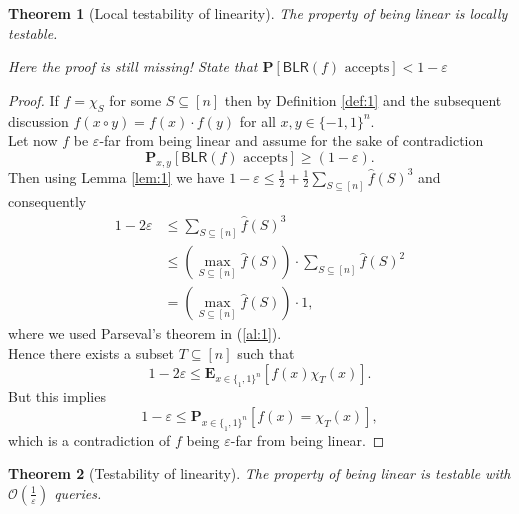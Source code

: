 \documentclass[a4paper]{article}
\newcommand{\prob}{\mathbf{P}}
\newcommand{\expe}{\mathbf{E}}
\newcommand{\nset}{[n]}
\newcommand{\eps}{\varepsilon}
\theoremstyle{plain}
\newtheorem{theorem}{Theorem}
\theoremstyle{definition}
\theoremstyle{remark}
\begin{document}
\begin{theorem}[Local testability of linearity] \label{thm:1}
  The property of being linear is locally testable. 
\end{theorem}

\emph{Here the proof is still missing! State that
  \(\prob[\textsf{BLR}(f) \text{ accepts}] < 1 - \eps\)}

\begin{proof}
  If \(f = \chi_S\) for some \(S\subseteq \nset\) then by Definition
  \ref{def:1} and the subsequent discussion \(f(x\circ y) = f(x) \cdot
  f(y)\) for all \(x,y \in \{-1,1\}^n\). \\
  Let now \(f\) be \(\eps\)-far from being linear and assume for the
  sake of contradiction 
  \[\prob_{x,y}\left[\textsf{BLR}(f) \text{ accepts}\right] \geq
  (1-\eps). \]
  Then using Lemma \ref{lem:1} we have \(1-\eps \leq \frac{1}{2} +
  \frac{1}{2} \sum_{S\subseteq \nset}\hat{f}(S)^3\) and consequently
  \begin{align}
    1 - 2\eps &\leq \sum_{S\subseteq \nset}\hat{f}(S)^3 \\
    &\leq \left(\max_{S\subseteq \nset} \hat{f}(S)\right)\cdot \sum_{S\subseteq \nset}\hat{f}(S)^2 \\
    &= \left(\max_{S\subseteq \nset} \hat{f}(S)\right) \cdot 1,  \label{al:1}
  \end{align}
  where we used Parseval's theorem in (\ref{al:1}). \\
  Hence there exists a subset \(T \subseteq \nset\) such that 
  \[1 - 2\eps \leq \expe_{x\in\{_1,1\}^n}\left[f(x)\chi_T(x)\right].\]
  But this implies 
  \[1 - \eps \leq \prob_{x\in\{_1,1\}^n}[f(x) = \chi_T(x)], \]
  which is a contradiction of \(f\) being \(\eps\)-far from being
  linear. 
\end{proof}

\begin{theorem}[Testability of linearity] \label{thm:2}
  The property of being linear is testable with
  \(\mathcal{O}\left(\frac{1}{\eps}\right)\) queries. 
\end{theorem}
\end{document}
